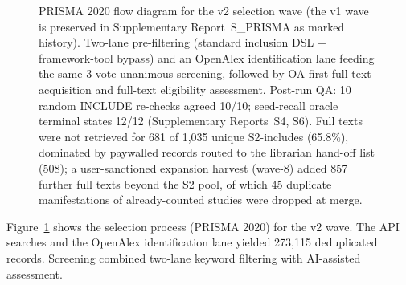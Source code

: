 \begin{figure}[t]
{%
}
\caption{PRISMA 2020 flow diagram for the v2 selection wave (the v1 wave is preserved in Supplementary Report~S\_PRISMA as marked history). Two-lane pre-filtering (standard inclusion DSL + framework-tool bypass) and an OpenAlex identification lane feeding the same 3-vote unanimous screening, followed by OA-first full-text acquisition and full-text eligibility assessment. Post-run QA: 10 random INCLUDE re-checks agreed 10/10; seed-recall oracle terminal states 12/12 (Supplementary Reports~S4, S6). Full texts were not retrieved for 681 of 1{,}035 unique S2-includes (65.8\%), dominated by paywalled records routed to the librarian hand-off list (508); a user-sanctioned expansion harvest (wave-8) added 857 further full texts beyond the S2 pool, of which 45 duplicate manifestations of already-counted studies were dropped at merge.}
\label{fig:prisma}
\end{figure}

Figure~\ref{fig:prisma} shows the selection process (PRISMA 2020) for the v2 wave. The API searches and the OpenAlex identification lane yielded 273{,}115 deduplicated records. Screening combined two-lane keyword filtering with AI-assisted assessment.

